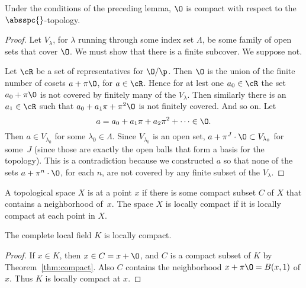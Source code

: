 \begin{theorem}\label{thm:compact}
Under the conditions of the preceding lemma, $\O$ is compact with
respect to the $\absspc{}$-topology. 
\end{theorem}
\begin{proof}
  Let $V_\lambda$, for $\lambda$ running through some index set
  $\Lambda$, be some family of open sets that cover $\O$.  We must
  show that there is a finite subcover.  We suppose not.
  
  Let $\cR$ be a set of representatives for $\O/\p$.  Then $\O$ is the
  union of the finite number of cosets $a+\pi\O$, for $a\in \cR$.
    Hence for at lest one $a_0\in \cR$ the set $a_0+\pi \O$
    is not covered by finitely many of the $V_\lambda$.  Then similarly
  there is an $a_1\in \cR$ such that $a_0 + a_1\pi + \pi^2\O$ is not
  finitely covered. And so on.  Let 
  $$
  a = a_0 + a_1\pi + a_2 \pi^2 + \cdots \in \O.
  $$
  Then $a\in V_{\lambda_0}$ for some $\lambda_0\in\Lambda$.  Since
  $V_{\lambda_0}$ is an open set, $a+\pi^J\cdot \O\subset
  V_{\lambda_0}$ for some~$J$ (since those are exactly the open balls
  that form a basis for the topology). This is a contradiction because
  we constructed $a$ so that none of the sets $a+\pi^n\cdot \O$, for
  each $n$, are not covered by any finite subset of the $V_{\lambda}$.
\end{proof}

\begin{definition}
  A topological space $X$ is  at a point $x$ if
  there is some compact subset $C$ of $X$ that contains a neighborhood
  of~$x$.  The space $X$ is locally compact if it is locally compact
  at each point in $X$.
\end{definition}
\begin{corollary}\label{cor:locally_compact}
The complete local field $K$ is locally compact.
\end{corollary}
\begin{proof}
  If $x\in K$, then $x \in C=x+\O$, and $C$ is a compact subset of $K$
  by Theorem~\ref{thm:compact}.  Also $C$ contains the neighborhood
  $x+\pi\O = B(x,1)$ of $x$.  Thus $K$ is locally compact at $x$.
\end{proof}

